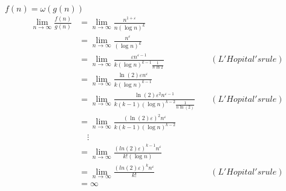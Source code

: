 \begin{parts}
    \begin{solution}
        $f(n) = \omega(g(n))$
        \begin{align*}
            \lim_{n\to\infty} \frac{f(n)}{g(n)} & = \lim_{n\to\infty} \frac{n^{1+\varepsilon}}{n(\log n)^k}                                                                   \\
                                                & = \lim_{n\to\infty} \frac{n^{\varepsilon}}{(\log n)^k}                                                                      \\
                                                & = \lim_{n\to\infty} \frac{\varepsilon n^{\varepsilon - 1}}{k(\log n)^{k-1} \frac{1}{n \ln{2}}}          & \quad (L'Hopital's rule) \\
                                                & = \lim_{n\to\infty} \frac{\ln(2) \varepsilon n^{\varepsilon}}{k(\log n)^{k-1}}                                                  \\
                                                & = \lim_{n\to\infty} \frac{\ln(2) \varepsilon^2 n^{\varepsilon - 1}}{k(k-1)(\log n)^{k-2} \frac{1}{n \ln(2)}}   & \quad (L'Hopital's rule) \\
                                                & = \lim_{n\to\infty} \frac{(\ln(2) \varepsilon)^2 n^{\varepsilon}}{k(k-1)(\log n)^{k-2}}                                              \\
                                                & \quad \vdots                                                                                                                \\
                                                & = \lim_{n\to\infty} \frac{(ln(2) \varepsilon)^{k-1} n^{\varepsilon}}{k!(\log n)}                                                    \\
                                                & = \lim_{n\to\infty} \frac{(ln(2) \varepsilon)^{k} n^{\varepsilon}}{k!}                                   & \quad (L'Hopital's rule) \\
                                                & = \infty
        \end{align*}
    \end{solution}

\end{parts}
